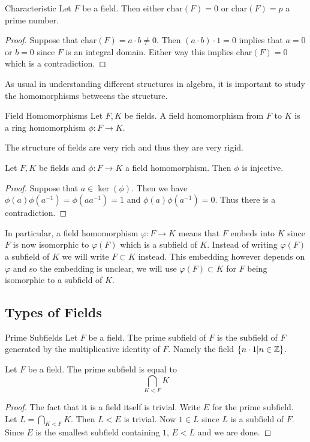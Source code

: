 \documentclass[a4paper]{article}
\begin{document}
\begin{prp}{Characteristic}{} Let $F$ be a field. Then either $\text{char}(F)=0$ or $\text{char}(F)=p$ a prime number. \tcbline
\begin{proof}
Suppose that $\text{char}(F)=a\cdot b\neq 0$. Then $(a\cdot b)\cdot 1=0$ implies that $a=0$ or $b=0$ since $F$ is an integral domain. Either way this implies $\text{char}(F)=0$ which is a contradiction. 
\end{proof}
\end{prp}

As usual in understanding different structures in algebra, it is important to study the homomorphisms betweens the structure. 

\begin{defn}{Field Homomorphisms}{} Let $F,K$ be fields. A field homomorphism from $F$ to $K$ is a ring homomorphism $\phi:F\to K$. 
\end{defn}

The structure of fields are very rich and thus they are very rigid. 

\begin{lmm}{}{} Let $F,K$ be fields and $\phi:F\to K$ a field homomorphism. Then $\phi$ is injective. \tcbline
\begin{proof}
Suppose that $a\in\ker(\phi)$. Then we have $\phi(a)\phi(a^{-1})=\phi(aa^{-1})=1$ and $\phi(a)\phi(a^{-1})=0$. Thus there is a contradiction. 
\end{proof}
\end{lmm}

In particular, a field homomorphism $\varphi:F\to K$ means that $F$ embeds into $K$ since $F$ is now isomorphic to $\varphi(F)$ which is a subfield of $K$. Instead of writing $\varphi(F)$ a subfield of $K$ we will write $F\subset K$ instead. This embedding however depends on $\varphi$ and so the embedding is unclear, we will use $\varphi(F)\subset K$ for $F$ being isomorphic to a subfield of $K$. 

\subsection{Types of Fields}
\begin{defn}{Prime Subfields}{} Let $F$ be a field. The prime subfield of $F$ is the subfield of $F$ generated by the multiplicative identity of $F$. Namely the field $\{n\cdot 1|n\in\mathbb{Z}\}$. 
\end{defn}

\begin{prp}{}{} Let $F$ be a field. The prime subfield is equal to $$\bigcap_{K<F}K$$ \tcbline
\begin{proof}
The fact that it is a field itself is trivial. Write $E$ for the prime subfield. Let $L=\bigcap_{K<F}K$.  Then $L<E$ is trivial. Now $1\in L$ since $L$ is a subfield of $F$. Since $E$ is the smallest subfield containing $1$, $E<L$ and we are done. 
\end{proof}
\end{prp}
\end{document}
